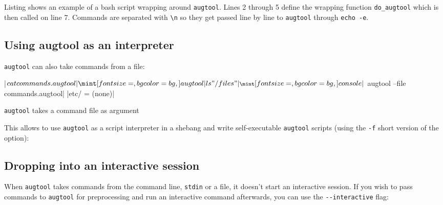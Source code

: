 \begin{quote}
\end{quote}

Listing  shows an example of a bash script wrapping around \verb!augtool!. Lines 2 through 5 define the wrapping function \verb!do_augtool! which is then called on line 7. Commands are separated with \verb!\n! so they get passed line by line to \verb!augtool! through \verb!echo -e!.


\subsection{Using augtool as an interpreter}

\verb!augtool! can also take commands from a file:

 

\begin{listing}
  \consolecode|$ cat commands.augtool|
  \augtoolcode|ls "/files"|
  \consolecode|$ augtool --file commands.augtool|
  \augtoolcode|etc/ = (none)|
  \caption{\texttt{augtool} takes a command file as argument}
  \label{lst:augtool_file_arg}
\end{listing}

This allows to use \verb!augtool! as a script interpreter in a shebang and write self-executable \verb!augtool! scripts (using the \verb!-f! short version of the option):


\subsection{Dropping into an interactive session}

When \verb!augtool! takes commands from the command line, \verb!stdin! or a file, it doesn't start an interactive session. If you wish to pass commands to \verb!augtool! for preprocessing and run an interactive command afterwards, you can use the \verb!--interactive! flag:

